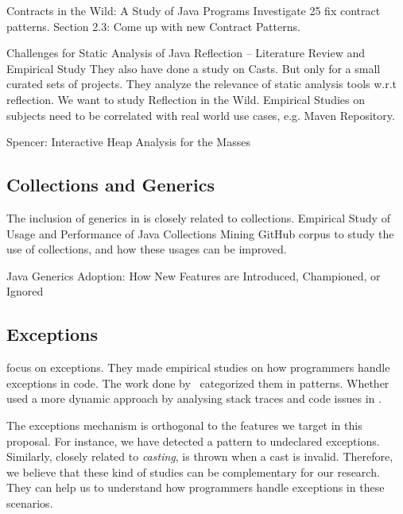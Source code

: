 Contracts in the Wild: A Study of Java Programs
Investigate 25 fix contract patterns.
Section 2.3: Come up with new Contract Patterns.
\cite{dietrich_contracts_2017,dietrich_contracts_2017-1}

\cite{landman_challenges_2017}
Challenges for Static Analysis of Java Reflection -- Literature Review and Empirical Study
They also have done a study on Casts.
But only for a small curated sets of projects.
They analyze the relevance of static analysis tools w.r.t reflection.
We want to study Reflection in the Wild.
Empirical Studies on subjects need to be correlated with real world use cases, e.g. Maven Repository.



Spencer: Interactive Heap Analysis for the Masses
\cite{brandauer_spencer:_2017}


\subsection*{Collections and Generics}

The inclusion of generics in \java{} is closely related to collections.
Empirical Study of Usage and Performance of Java Collections
Mining GitHub corpus to study the use of collections, and how these usages can be improved.
\cite{costa_empirical_2017}

Java Generics Adoption: How New Features are Introduced, Championed, or Ignored~\cite{parnin_java_2011,parnin_adoption_2013}


\subsection*{Exceptions}

\cite{kery_examining_2016,asaduzzaman_how_2016} focus on exceptions.
They made empirical studies on how programmers handle exceptions in \java{} code.
The work done by~\cite{nakshatri_analysis_2016} categorized them in patterns.
Whether~\cite{coelho_unveiling_2015} used a more dynamic approach by analysing stack traces and code issues in \github{}.

The exceptions mechanism is orthogonal to the features we target in this proposal.
For instance, we have detected a \smu{} pattern to \throw{} undeclared exceptions.
Similarly, closely related to \emph{casting}, \cce{} is thrown when a cast is invalid.
Therefore, we believe that these kind of studies can be complementary for our research. They can help us to understand how programmers handle exceptions in these scenarios.


